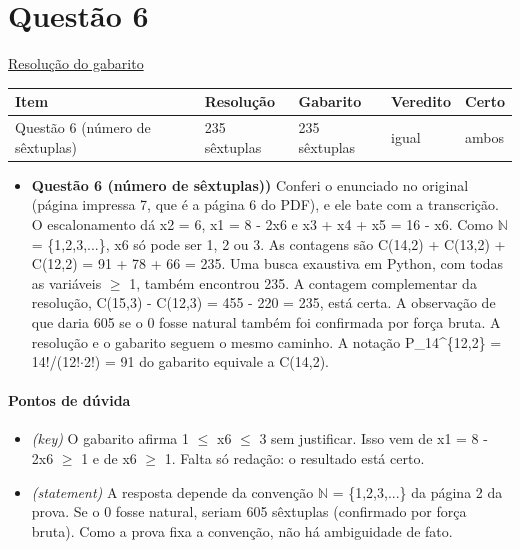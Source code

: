 \documentclass{article}%
\begin{document}
\section*{Questão 6}%
\href{https://poliedroresolve.sistemapoliedro.com.br/vestibulares/ita/2027/ita-2-fase-dia-1-20-10-2026-2-fase-dia-1/dissertativa-6-matematica-2-fase-dia-1-ita-2027}{Resolução do gabarito}\par\smallskip%
\begin{longtable}{@{}p{} p{} p{} p{} p{}@{}}\toprule Item & Resolução & Gabarito & Veredito & Certo \\ \midrule
Questão 6 (número de sêxtuplas) & 235 sêxtuplas & 235 sêxtuplas & igual & ambos \\
\bottomrule\end{longtable}%
\begin{itemize}%
\item%
\textbf{Questão 6 (número de sêxtuplas))} Conferi o enunciado no original (página impressa 7, que é a página 6 do PDF), e ele bate com a transcrição. O escalonamento dá x2 = 6, x1 = 8 - 2x6 e x3 + x4 + x5 = 16 - x6. Como $\mathbb{N}$ = \{1,2,3,...\}, x6 só pode ser 1, 2 ou 3. As contagens são C(14,2) + C(13,2) + C(12,2) = 91 + 78 + 66 = 235. Uma busca exaustiva em Python, com todas as variáveis $\geq$ 1, também encontrou 235. A contagem complementar da resolução, C(15,3) - C(12,3) = 455 - 220 = 235, está certa. A observação de que daria 605 se o 0 fosse natural também foi confirmada por força bruta. A resolução e o gabarito seguem o mesmo caminho. A notação P\_14\^{}\{12,2\} = 14!/(12!$\cdot$2!) = 91 do gabarito equivale a C(14,2).%
\end{itemize}%
\paragraph{Pontos de dúvida}%
\begin{itemize}%
\item%
\textit{(key)} O gabarito afirma 1 $\leq$ x6 $\leq$ 3 sem justificar. Isso vem de x1 = 8 - 2x6 $\geq$ 1 e de x6 $\geq$ 1. Falta só redação: o resultado está certo.%
\item%
\textit{(statement)} A resposta depende da convenção $\mathbb{N}$ = \{1,2,3,...\} da página 2 da prova. Se o 0 fosse natural, seriam 605 sêxtuplas (confirmado por força bruta). Como a prova fixa a convenção, não há ambiguidade de fato.%
\end{itemize}%
\end{document}
